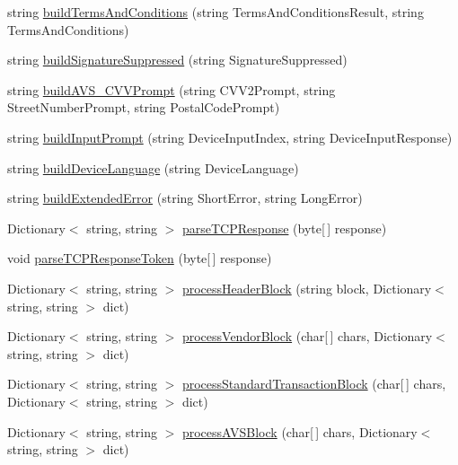 \begin{DoxyCompactItemize}
string \mbox{\hyperlink{class_form_sim_1_1_t_c_p_handler_ab4c5c55715876db4c654f8a2abccceb6}{build\+Terms\+And\+Conditions}} (string Terms\+And\+Conditions\+Result, string Terms\+And\+Conditions)
\item 
string \mbox{\hyperlink{class_form_sim_1_1_t_c_p_handler_a633cebb97fe15074cbf3400eda7add31}{build\+Signature\+Suppressed}} (string Signature\+Suppressed)
\item 
string \mbox{\hyperlink{class_form_sim_1_1_t_c_p_handler_a1ccc91513b133900c48ca8b273d6a221}{build\+A\+V\+S\+\_\+\+C\+V\+V\+Prompt}} (string C\+V\+V2\+Prompt, string Street\+Number\+Prompt, string Postal\+Code\+Prompt)
\item 
string \mbox{\hyperlink{class_form_sim_1_1_t_c_p_handler_ab71d64e5e17fd1d66f5f803b0d5e1552}{build\+Input\+Prompt}} (string Device\+Input\+Index, string Device\+Input\+Response)
\item 
string \mbox{\hyperlink{class_form_sim_1_1_t_c_p_handler_a59e96abe11df9317a3c3b84fe5f4bd4b}{build\+Device\+Language}} (string Device\+Language)
\item 
string \mbox{\hyperlink{class_form_sim_1_1_t_c_p_handler_a402fdcb0d83b8508f15f996f26f9ef7e}{build\+Extended\+Error}} (string Short\+Error, string Long\+Error)
\item 
Dictionary$<$ string, string $>$ \mbox{\hyperlink{class_form_sim_1_1_t_c_p_handler_acd362681744f696310fde701c47309eb}{parse\+T\+C\+P\+Response}} (byte\mbox{[}$\,$\mbox{]} response)
\item 
void \mbox{\hyperlink{class_form_sim_1_1_t_c_p_handler_a25c22dcc9e98e6d182d62dd47a1cf7e0}{parse\+T\+C\+P\+Response\+Token}} (byte\mbox{[}$\,$\mbox{]} response)
\item 
Dictionary$<$ string, string $>$ \mbox{\hyperlink{class_form_sim_1_1_t_c_p_handler_ab274f99187a6bff02a17ec2c2e9c1d6a}{process\+Header\+Block}} (string block, Dictionary$<$ string, string $>$ dict)
\item 
Dictionary$<$ string, string $>$ \mbox{\hyperlink{class_form_sim_1_1_t_c_p_handler_abc4a88e1782473cc09b886e80e2a56dd}{process\+Vendor\+Block}} (char\mbox{[}$\,$\mbox{]} chars, Dictionary$<$ string, string $>$ dict)
\item 
Dictionary$<$ string, string $>$ \mbox{\hyperlink{class_form_sim_1_1_t_c_p_handler_ab1ebfa369393b79fda9bf02f2c1e4a94}{process\+Standard\+Transaction\+Block}} (char\mbox{[}$\,$\mbox{]} chars, Dictionary$<$ string, string $>$ dict)
\item 
Dictionary$<$ string, string $>$ \mbox{\hyperlink{class_form_sim_1_1_t_c_p_handler_ac58ef5265837b773924480e78f287737}{process\+A\+V\+S\+Block}} (char\mbox{[}$\,$\mbox{]} chars, Dictionary$<$ string, string $>$ dict)

\end{DoxyCompactItemize}

